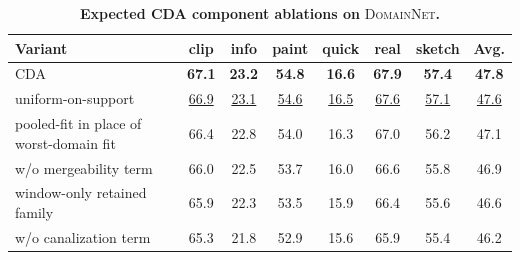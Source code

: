 \documentclass[10pt]{article}
\newcommand{\data}[1]{\textsc{#1}}
\newcommand{\Expected}[1]{#1}
\newcommand{\Best}[1]{\textbf{\Expected{#1}}}
\newcommand{\Second}[1]{\underline{\Expected{#1}}}
\begin{document}
\begin{table}[H]
\centering
\small
\renewcommand{\arraystretch}{1.08}
\caption{\textbf{Expected CDA component ablations on} \data{DomainNet}\textbf{.}}
\label{tab:cda_domainnet_ablation_expected}
\setlength{\tabcolsep}{3pt}
\begin{tabular}{lccccccc}
\toprule
\textbf{Variant} & \textbf{clip} & \textbf{info} & \textbf{paint} & \textbf{quick} & \textbf{real} & \textbf{sketch} & \textbf{Avg.} \\
\midrule
CDA & \Best{67.1} & \Best{23.2} & \Best{54.8} & \Best{16.6} & \Best{67.9} & \Best{57.4} & \Best{47.8} \\
uniform-on-support & \Second{66.9} & \Second{23.1} & \Second{54.6} & \Second{16.5} & \Second{67.6} & \Second{57.1} & \Second{47.6} \\
pooled-fit in place of worst-domain fit & \Expected{66.4} & \Expected{22.8} & \Expected{54.0} & \Expected{16.3} & \Expected{67.0} & \Expected{56.2} & \Expected{47.1} \\
w/o mergeability term & \Expected{66.0} & \Expected{22.5} & \Expected{53.7} & \Expected{16.0} & \Expected{66.6} & \Expected{55.8} & \Expected{46.9} \\
window-only retained family & \Expected{65.9} & \Expected{22.3} & \Expected{53.5} & \Expected{15.9} & \Expected{66.4} & \Expected{55.6} & \Expected{46.6} \\
w/o canalization term & \Expected{65.3} & \Expected{21.8} & \Expected{52.9} & \Expected{15.6} & \Expected{65.9} & \Expected{55.4} & \Expected{46.2} \\
\bottomrule
\end{tabular}
\end{table}

\clearpage
\end{document}
